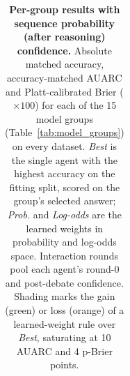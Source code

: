 \begin{table}[p]
{\begin{tabular}{cc|c|ccc|ccc|c|ccc|ccc|c|ccc|ccc}
\bottomrule
\end{tabular}}
\caption{\textbf{Per-group results with sequence probability (after reasoning) confidence.} Absolute matched accuracy, accuracy-matched AUARC and Platt-calibrated Brier ($\times 100$) for each of the 15 model groups (Table~\ref{tab:model_groups}) on every dataset. \emph{Best} is the single agent with the highest accuracy on the fitting split, scored on the group's selected answer; \emph{Prob.} and \emph{Log-odds} are the learned weights in probability and log-odds space. Interaction rounds pool each agent's round-0 and post-debate confidence. Shading marks the gain (green) or loss (orange) of a learned-weight rule over \emph{Best}, saturating at 10 AUARC and 4 p-Brier points.}
\label{tab:per_group_seq_reasoned}
\end{table}
